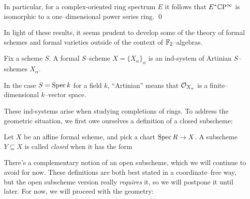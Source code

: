 \begin{corollary}\label{CPinftyNiceCalculation}
In particular, for a complex-oriented ring spectrum $E$ it follows that $E^* \mathbb{C}\mathrm P^\infty$ is isomorphic to a one--dimensional power series ring. \qed
\end{corollary}

In light of these results, it seems prudent to develop some of the theory of formal schemes and formal varieties outside of the context of $\mathbb F_2$--algebras.

\begin{definition}
Fix a scheme $S$.  A formal $S$--scheme $X = \{X_\alpha\}_\alpha$ is an ind-system of Artinian $S$--schemes $X_\alpha$.
\end{definition}

\begin{remark}
In the case $S = \operatorname{Spec} k$ for a field $k$, ``Artinian'' means that $\mathcal{O}_{X_\alpha}$ is a finite--dimensional $k$--vector space.
\end{remark}

These ind-systems arise when studying completions of rings.  To address the geometric situation, we first owe ourselves a definition of a closed subscheme:
\begin{definition}\label{DefnCompletion}
Let $X$ be an affine formal scheme, and pick a chart $\operatorname{Spec} R \to X$.  A subscheme $Y \subseteq X$ is called \textit{closed} when it has the form
\begin{center}
\end{center}
\end{definition}

There's a complementary notion of an open subscheme, which we will continue to avoid for now.  These definitions are both best stated in a coordinate--free way, but the open subscheme version really \emph{requires} it, so we will postpone it until later.  For now, we will proceed with the geometry:

